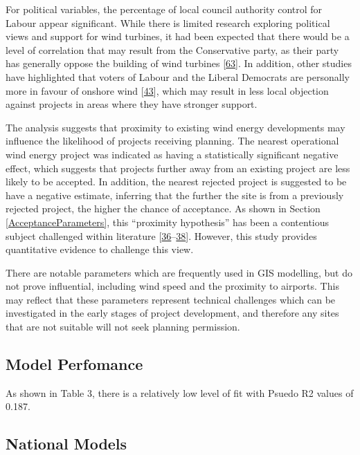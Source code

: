 \documentclass[a4paper,]{article}
\theoremstyle{definition}
\theoremstyle{definition}
\theoremstyle{definition}
\theoremstyle{remark}
\begin{document}
For political variables, the percentage of local council authority
control for Labour appear significant. While there is limited research
exploring political views and support for wind turbines, it had been
expected that there would be a level of correlation that may result from
the Conservative party, as their party has generally oppose the building
of wind turbines {[}\protect\hyperlink{ref-Smith2016}{63}{]}. In
addition, other studies have highlighted that voters of Labour and the
Liberal Democrats are personally more in favour of onshore wind
{[}\protect\hyperlink{ref-Populus2005}{43}{]}, which may result in less
local objection against projects in areas where they have stronger
support.

The analysis suggests that proximity to existing wind energy
developments may influence the likelihood of projects receiving
planning. The nearest operational wind energy project was indicated as
having a statistically significant negative effect, which suggests that
projects further away from an existing project are less likely to be
accepted. In addition, the nearest rejected project is suggested to be
have a negative estimate, inferring that the further the site is from a
previously rejected project, the higher the chance of acceptance. As
shown in Section \ref{AcceptanceParameters}, this ``proximity
hypothesis'' has been a contentious subject challenged within literature
{[}\protect\hyperlink{ref-Eltham2008}{36}--\protect\hyperlink{ref-Ladenburg2006}{38}{]}.
However, this study provides quantitative evidence to challenge this
view.

There are notable parameters which are frequently used in GIS modelling,
but do not prove influential, including wind speed and the proximity to
airports. This may reflect that these parameters represent technical
challenges which can be investigated in the early stages of project
development, and therefore any sites that are not suitable will not seek
planning permission.

\subsection{Model Perfomance}\label{model-perfomance}

As shown in Table 3, there is a relatively low level of fit with Psuedo
R2 values of 0.187.

\subsection{National Models}\label{national-models}
\end{document}
